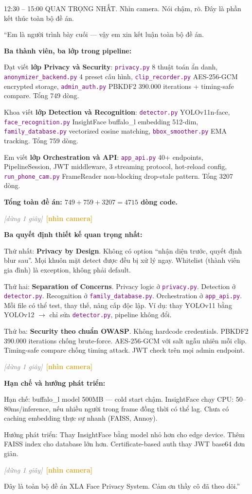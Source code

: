 \documentclass[12pt, a4paper]{article}
\newcommand{\fpath}[1]{\texttt{\textcolor{purple}{#1}}}
\newcommand{\pause}{\textcolor{gray}{\textit{[dừng 1 giây]}}}
\newcommand{\camlook}{\textcolor{Goldenrod}{\textbf{[nhìn camera]}}}
\begin{document}
\begin{timing}{12:30 -- 15:00}
QUAN TRỌNG NHẤT. Nhìn camera. Nói chậm, rõ. Đây là phần kết thúc toàn bộ đề án.
\end{timing}

\begin{say}
``Em là người trình bày cuối --- vậy em xin kết luận toàn bộ đề án.

\textbf{Ba thành viên, ba lớp trong pipeline:}

Đạt viết \textbf{lớp Privacy và Security}:
\fpath{privacy.py} 8 thuật toán ẩn danh,
\fpath{anonymizer\_backend.py} 4 preset cấu hình,
\fpath{clip\_recorder.py} AES-256-GCM encrypted storage,
\fpath{admin\_auth.py} PBKDF2 390.000 iterations + timing-safe compare.
Tổng 749 dòng.

Khoa viết \textbf{lớp Detection và Recognition}:
\fpath{detector.py} YOLOv11n-face,
\fpath{face\_recognition.py} InsightFace buffalo\_l embedding 512-dim,
\fpath{family\_database.py} vectorized cosine matching,
\fpath{bbox\_smoother.py} EMA tracking.
Tổng 759 dòng.

Em viết \textbf{lớp Orchestration và API}:
\fpath{app\_api.py} 40+ endpoints, PipelineSession, JWT middleware,
3 streaming protocol, hot-reload config,
\fpath{run\_phone\_cam.py} FrameReader non-blocking drop-stale pattern.
Tổng 3207 dòng.

\textbf{Tổng toàn đề án: $749 + 759 + 3207 = 4715$ dòng code.}

\pause\ \camlook\

\textbf{Ba quyết định thiết kế quan trọng nhất:}

Thứ nhất: \textbf{Privacy by Design}.
Không có option ``nhận diện trước, quyết định blur sau''.
Mọi khuôn mặt detect được đều bị xử lý ngay.
Whitelist (thành viên gia đình) là exception, không phải default.

Thứ hai: \textbf{Separation of Concerns}.
Privacy logic ở \fpath{privacy.py}. Detection ở \fpath{detector.py}.
Recognition ở \fpath{family\_database.py}. Orchestration ở \fpath{app\_api.py}.
Mỗi file có thể test, thay thế, nâng cấp độc lập.
Ví dụ: thay YOLOv11 bằng YOLOv12 $\to$ chỉ sửa \fpath{detector.py}, pipeline không đổi.

Thứ ba: \textbf{Security theo chuẩn OWASP}.
Không hardcode credentials. PBKDF2 390.000 iterations chống brute-force.
AES-256-GCM với salt ngẫu nhiên mỗi clip.
Timing-safe compare chống timing attack.
JWT check trên mọi admin endpoint.

\pause\ \camlook\

\textbf{Hạn chế và hướng phát triển:}

Hạn chế: buffalo\_l model 500MB --- cold start chậm.
InsightFace chạy CPU: 50--80ms/inference, nếu nhiều người trong frame đồng thời có thể lag.
Chưa có caching embedding thực sự nhanh (FAISS, Annoy).

Hướng phát triển:
Thay InsightFace bằng model nhỏ hơn cho edge device.
Thêm FAISS index cho database lớn hơn.
Certificate-based auth thay JWT base64 đơn giản.

\pause\ \camlook\

Đây là toàn bộ đề án XLA Face Privacy System.
Cảm ơn thầy cô đã theo dõi.''
\end{say}
\end{document}
